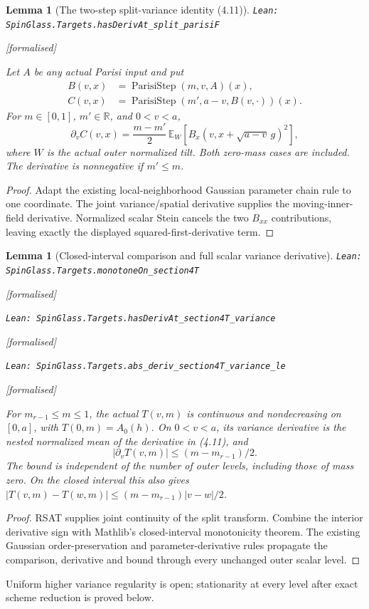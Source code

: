 \documentclass[11pt]{article}
\providecommand{\lean}[1]{\leavevmode\par\nopagebreak
  {\noindent\normalfont\footnotesize\raggedright\texttt{Lean: #1}\par}\nopagebreak}
\providecommand{\leanok}{\par\nopagebreak
  {\noindent\normalfont\footnotesize\textcolor{green!50!black}{[formalised]}\par}\nopagebreak}
\newtheorem{lemma}[theorem]{Lemma}
\begin{document}
\begin{lemma}[The two-step split-variance identity (4.11)]
\lean{SpinGlass.Targets.hasDerivAt\_split\_parisiF}\leanok
Let $A$ be any actual Parisi input and put
\[
 \begin{aligned}
 B(v,x)&=\operatorname{ParisiStep}(m,v,A)(x),\\
 C(v,x)&=\operatorname{ParisiStep}(m',a-v,B(v,\cdot))(x).
 \end{aligned}
\]
For $m\in[0,1]$, $m'\in\mathbb R$, and $0<v<a$,
\[
 \partial_v C(v,x)=\frac{m-m'}2\,\mathbb E_W
       [B_x(v,x+\sqrt{a-v}\,g)^2],
\]
where $W$ is the actual outer normalized tilt. Both zero-mass cases are included.
The derivative is nonnegative if $m'\le m$.
\end{lemma}
\begin{proof}
Adapt the existing local-neighborhood Gaussian parameter chain rule to one
coordinate. The joint variance/spatial derivative supplies the moving-inner-field
derivative. Normalized scalar Stein cancels the two $B_{xx}$ contributions,
leaving exactly the displayed squared-first-derivative term.
\end{proof}
\begin{lemma}[Closed-interval comparison and full scalar variance derivative]
\lean{SpinGlass.Targets.monotoneOn\_section4T}\leanok
\lean{SpinGlass.Targets.hasDerivAt\_section4T\_variance}\leanok
\lean{SpinGlass.Targets.abs\_deriv\_section4T\_variance\_le}\leanok
For $m_{r-1}\le m\le1$, the actual $T(v,m)$ is continuous and nondecreasing
on $[0,a]$, with $T(0,m)=A_0(h)$. On $0<v<a$, its variance derivative
is the nested normalized mean of the derivative in (4.11), and
\[
 |\partial_v T(v,m)|\le (m-m_{r-1})/2.
\]
The bound is independent of the number of outer levels, including those of mass zero.
On the closed interval this also gives
$|T(v,m)-T(w,m)|\le(m-m_{r-1})|v-w|/2$.
\end{lemma}
\begin{proof}
RSAT supplies joint continuity of the split transform. Combine the interior
derivative sign with Mathlib's closed-interval monotonicity theorem. The existing
Gaussian order-preservation and parameter-derivative rules propagate the
comparison, derivative and bound through every unchanged outer scalar level.
\end{proof}
Uniform higher variance regularity is open; stationarity at every level
after exact scheme reduction is proved below.
\end{document}

